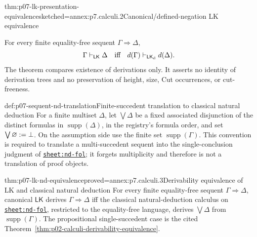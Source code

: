 \begin{hbtheorem}{thm:p07-lk-presentation-equivalence}{sketched=annex:p7.calculi.2}{Canonical/defined-negation LK equivalence}
\par\noindent
For every finite equality-free sequent \(\Gamma\Rightarrow\Delta\),
\[
 \Gamma\vdash_{\mathsf{LK}}\Delta
 \quad\text{iff}\quad
 d(\Gamma)\vdash_{\mathsf{LK}_{\mathrm d}}d(\Delta).
\]
The theorem compares existence of derivations only.  It asserts no identity
of derivation trees and no preservation of height, size, Cut occurrences, or
cut-freeness.
\end{hbtheorem}

\begin{hbdefinition}{def:p07-sequent-nd-translation}{Finite-succedent translation to classical natural deduction}
For a finite multiset \(\Delta\), let \(\bigvee\Delta\) be a fixed associated
disjunction of the distinct formulas in \(\operatorname{supp}(\Delta)\), in
the registry's formula order, and set
\(\bigvee\varnothing\mathrel{:=}\bot\).  On the assumption side use the finite set
\(\operatorname{supp}(\Gamma)\).  This convention is required to translate
a multi-succedent sequent into the single-conclusion judgment of
\hyperref[sheet:nd-fol]{\texttt{sheet:nd-fol}}; it forgets multiplicity and
therefore is not a translation of proof objects.
\end{hbdefinition}

\begin{hbtheorem}{thm:p07-lk-nd-equivalence}{proved=annex:p7.calculi.3}{Derivability equivalence of LK and classical natural deduction}
For every finite equality-free sequent \(\Gamma\Rightarrow\Delta\), canonical
\(\mathsf{LK}\) derives \(\Gamma\Rightarrow\Delta\) iff the classical
natural-deduction calculus on
\hyperref[sheet:nd-fol]{\texttt{sheet:nd-fol}}, restricted to the
equality-free language, derives \(\bigvee\Delta\) from
\(\operatorname{supp}(\Gamma)\).  The propositional single-succedent case is
the cited Theorem~\ref{thm:p02-calculi-derivability-equivalence}.
\end{hbtheorem}

